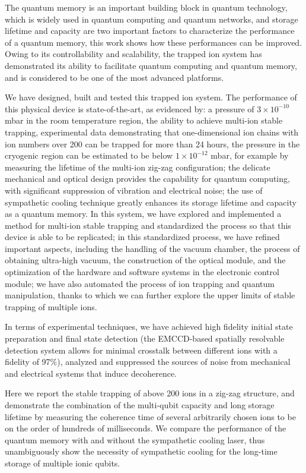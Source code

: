 \begin{abstract*}

  The quantum memory is an important building block in quantum technology, which is widely used in quantum computing and quantum networks, and storage lifetime and capacity are two important factors to characterize the performance of a quantum memory, this work shows how these performances can be improved. Owing to its controllability and scalability, the trapped ion system has demonstrated its ability to facilitate quantum computing and quantum memory, and is considered to be one of the most advanced platforms.

  We have designed, built and tested this trapped ion system. The performance of this physical device is state-of-the-art, as evidenced by: a pressure of $3 \times {10}^{-10}$ mbar in the room temperature region, the ability to achieve multi-ion stable trapping, experimental data demonstrating that one-dimensional ion chains with ion numbers over 200 can be trapped for more than 24 hours, the pressure in the cryogenic region can be estimated to be below $1 \times {10}^{-12}$ mbar, for example by measuring the lifetime of the multi-ion zig-zag configuration; the delicate mechanical and optical design provides the capability for quantum computing, with significant suppression of vibration and electrical noise; the use of sympathetic cooling technique greatly enhances its storage lifetime and capacity as a quantum memory. In this system, we have explored and implemented a method for multi-ion stable trapping and standardized the process so that this device is able to be replicated; in this standardized process, we have refined important aspects, including the handling of the vacuum chamber, the process of obtaining ultra-high vacuum, the construction of the optical module, and the optimization of the hardware and software systems in the electronic control module; we have also automated the process of ion trapping and quantum manipulation, thanks to which we can further explore the upper limits of stable trapping of multiple ions.

  In terms of experimental techniques, we have achieved high fidelity initial state preparation and final state detection (the EMCCD-based spatially resolvable detection system allows for minimal crosstalk between different ions with a fidelity of 97\%), analyzed and suppressed the sources of noise from mechanical and electrical systems that induce decoherence.

  Here we report the stable trapping of above 200 ions in a zig-zag structure, and demonstrate the combination of the multi-qubit capacity and long storage lifetime by measuring the coherence time of several arbitrarily chosen ions to be on the order of hundreds of milliseconds. We compare the performance of the quantum memory with and without the sympathetic cooling laser, thus unambiguously show the necessity of sympathetic cooling for the long-time storage of multiple ionic qubits.


\end{abstract*}
